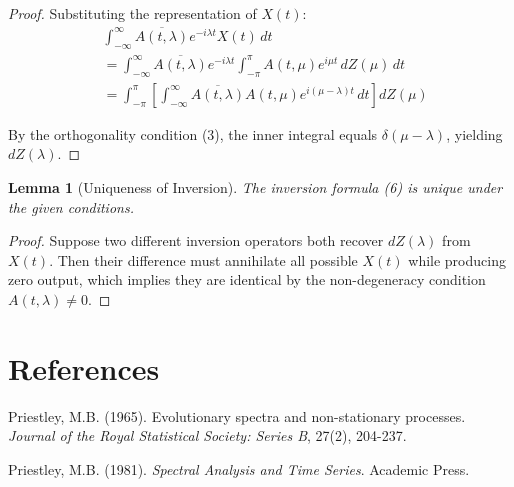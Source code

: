 \documentclass{article}
\newtheorem{lemma}{Lemma}
\newtheorem{lemma}{Lemma}
\begin{document}
\begin{proof}
Substituting the representation of $X(t)$:
\begin{align}
&\int_{-\infty}^{\infty} \overline{A(t,\lambda)} e^{-i\lambda t} X(t) \, dt \\
&= \int_{-\infty}^{\infty} \overline{A(t,\lambda)} e^{-i\lambda t} \int_{-\pi}^{\pi} A(t,\mu) e^{i\mu t} \, dZ(\mu) \, dt \\
&= \int_{-\pi}^{\pi} \left[\int_{-\infty}^{\infty} \overline{A(t,\lambda)} A(t,\mu) e^{i(\mu-\lambda)t} \, dt\right] dZ(\mu)
\end{align}

By the orthogonality condition (3), the inner integral equals $\delta(\mu - \lambda)$, yielding $dZ(\lambda)$.
\end{proof}

\begin{lemma}[Uniqueness of Inversion]
The inversion formula (6) is unique under the given conditions.
\end{lemma}

\begin{proof}
Suppose two different inversion operators both recover $dZ(\lambda)$ from $X(t)$. Then their difference must annihilate all possible $X(t)$ while producing zero output, which implies they are identical by the non-degeneracy condition $A(t,\lambda) \neq 0$.
\end{proof}

\section{References}

Priestley, M.B. (1965). Evolutionary spectra and non-stationary processes. \textit{Journal of the Royal Statistical Society: Series B}, 27(2), 204-237.

Priestley, M.B. (1981). \textit{Spectral Analysis and Time Series}. Academic Press.
\end{document}
